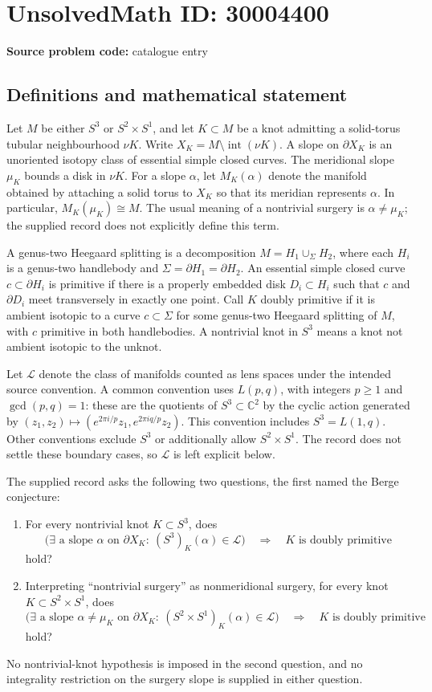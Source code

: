 \documentclass[11pt]{article}
\newcommand{\C}{\mathbb{C}}
\begin{document}
\section*{UnsolvedMath ID: 30004400}
\textbf{Source problem code:} catalogue entry
\subsection{Definitions and mathematical statement}
Let \(M\) be either \(S^3\) or \(S^2\times S^1\), and let \(K\subset M\) be a knot admitting a solid-torus tubular neighbourhood \(\nu K\). Write \(X_K=M\setminus\operatorname{int}(\nu K)\). A slope on \(\partial X_K\) is an unoriented isotopy class of essential simple closed curves. The meridional slope \(\mu_K\) bounds a disk in \(\nu K\). For a slope \(\alpha\), let \(M_K(\alpha)\) denote the manifold obtained by attaching a solid torus to \(X_K\) so that its meridian represents \(\alpha\). In particular, \(M_K(\mu_K)\cong M\). The usual meaning of a nontrivial surgery is \(\alpha\ne\mu_K\); the supplied record does not explicitly define this term.

A genus-two Heegaard splitting is a decomposition \(M=H_1\cup_\Sigma H_2\), where each \(H_i\) is a genus-two handlebody and \(\Sigma=\partial H_1=\partial H_2\). An essential simple closed curve \(c\subset\partial H_i\) is primitive if there is a properly embedded disk \(D_i\subset H_i\) such that \(c\) and \(\partial D_i\) meet transversely in exactly one point. Call \(K\) doubly primitive if it is ambient isotopic to a curve \(c\subset\Sigma\) for some genus-two Heegaard splitting of \(M\), with \(c\) primitive in both handlebodies. A nontrivial knot in \(S^3\) means a knot not ambient isotopic to the unknot.

Let \(\mathcal L\) denote the class of manifolds counted as lens spaces under the intended source convention. A common convention uses \(L(p,q)\), with integers \(p\ge1\) and \(\gcd(p,q)=1\): these are the quotients of \(S^3\subset\C^2\) by the cyclic action generated by \((z_1,z_2)\mapsto(e^{2\pi i/p}z_1,e^{2\pi iq/p}z_2)\). This convention includes \(S^3=L(1,q)\). Other conventions exclude \(S^3\) or additionally allow \(S^2\times S^1\). The record does not settle these boundary cases, so \(\mathcal L\) is left explicit below.

The supplied record asks the following two questions, the first named the Berge conjecture:
\begin{enumerate}
\item For every nontrivial knot \(K\subset S^3\), does
\[
\bigl(\exists\text{ a slope }\alpha\text{ on }\partial X_K:\ (S^3)_K(\alpha)\in\mathcal L\bigr)
\quad\Longrightarrow\quad K\text{ is doubly primitive}
\]
hold?
\item Interpreting ``nontrivial surgery'' as nonmeridional surgery, for every knot \(K\subset S^2\times S^1\), does
\[
\bigl(\exists\text{ a slope }\alpha\ne\mu_K\text{ on }\partial X_K:\
(S^2\times S^1)_K(\alpha)\in\mathcal L\bigr)
\quad\Longrightarrow\quad K\text{ is doubly primitive}
\]
hold?
\end{enumerate}
No nontrivial-knot hypothesis is imposed in the second question, and no integrality restriction on the surgery slope is supplied in either question.
\end{document}
